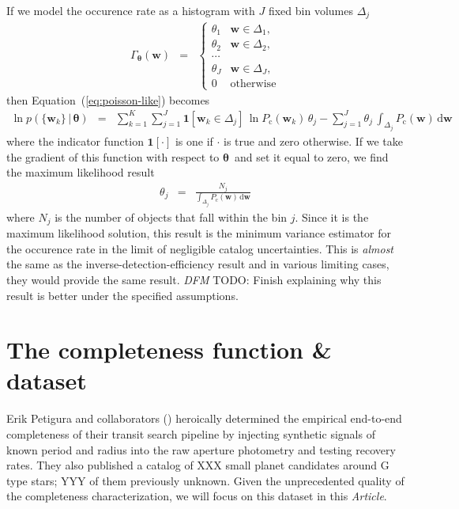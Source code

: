 \documentclass[12pt,preprint]{aastex}
\newcommand{\paper}{\emph{Article}}
\newcommand{\Eq}[1]{Equation~(\ref{eq:#1})}
\newcommand{\eq}[1]{\Eq{#1}}
\newcommand{\dd}{\ensuremath{\,\mathrm{d}}}
\newcommand{\bvec}[1]{\ensuremath{\boldsymbol{#1}}}
\newcommand{\todo}[3]{{\color{#2} \emph{#1} TODO: #3}}
\newcommand{\dfmtodo}[1]{\todo{DFM}{red}{#1}}
\newcommand{\rate}{\ensuremath{\Gamma}}
\newcommand{\ratepar}{{\ensuremath{\theta}}}
\newcommand{\ratepars}{{\ensuremath{\bvec{\ratepar}}}}
\newcommand{\completeness}{{\ensuremath{P_\mathrm{c}}}}
\newcommand{\entry}{{\ensuremath{\bvec{w}}}}
\newcommand{\binarea}{{\ensuremath{\Delta}}}
\begin{document}
If we model the occurence rate as a histogram with $J$ fixed bin volumes
$\binarea_j$
\begin{eqnarray}
\rate_\ratepars (\entry) &=& \left\{\begin{array}{ll}
\ratepar_1 & \entry \in \binarea_1,\\
\ratepar_2 & \entry \in \binarea_2,\\
\cdots \\
\ratepar_J & \entry \in \binarea_J,\\
0 & \mathrm{otherwise}
\end{array}\right.
\end{eqnarray}
then \eq{poisson-like} becomes
\begin{eqnarray}
\ln p(\{\entry_k\}\,|\,\ratepars) &=&
    \sum_{k=1}^K \sum_{j=1}^J \mathbf{1}[\entry_k \in
        \binarea_j]\,\ln\completeness(\entry_k)\,\ratepar_j
    -\sum_{j=1}^J\ratepar_j\,\int_{\binarea_j} \completeness(\entry)\dd\entry
\end{eqnarray}
where the indicator function $\mathbf{1}[\cdot]$ is one if $\cdot$ is true and
zero otherwise.
If we take the gradient of this function with respect to \ratepars\ and set it
equal to zero, we find the maximum likelihood result
\begin{eqnarray}
\ratepar_j &=& \frac{N_j}{\int_{\binarea_j} \completeness(\entry)\dd\entry}
\end{eqnarray}
where $N_j$ is the number of objects that fall within the bin $j$.
Since it is the maximum likelihood solution, this result is the minimum
variance estimator for the occurence rate in the limit of negligible catalog
uncertainties.
This is \emph{almost} the same as the inverse-detection-efficiency result and
in various limiting cases, they would provide the same result.
\dfmtodo{Finish explaining why this result is better under the specified
assumptions.}

\section{The completeness function \& dataset}

Erik Petigura and collaborators (\citealt{petigura-a,petigura}) heroically
determined the empirical end-to-end completeness of their transit search
pipeline by injecting synthetic signals of known period and radius into the
raw aperture photometry and testing recovery rates.
They also published a catalog of XXX small planet candidates around G type
stars; YYY of them previously unknown.
Given the unprecedented quality of the completeness characterization, we will
focus on this dataset in this \paper.
\end{document}
